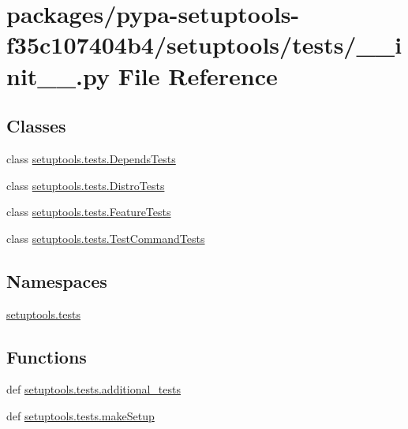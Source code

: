 \hypertarget{packages_2pypa-setuptools-f35c107404b4_2setuptools_2tests_2____init_____8py}{}\section{packages/pypa-\/setuptools-\/f35c107404b4/setuptools/tests/\+\_\+\+\_\+init\+\_\+\+\_\+.py File Reference}
\label{packages_2pypa-setuptools-f35c107404b4_2setuptools_2tests_2____init_____8py}
\subsection*{Classes}
\begin{DoxyCompactItemize}
\item 
class \hyperlink{classsetuptools_1_1tests_1_1DependsTests}{setuptools.\+tests.\+Depends\+Tests}
\item 
class \hyperlink{classsetuptools_1_1tests_1_1DistroTests}{setuptools.\+tests.\+Distro\+Tests}
\item 
class \hyperlink{classsetuptools_1_1tests_1_1FeatureTests}{setuptools.\+tests.\+Feature\+Tests}
\item 
class \hyperlink{classsetuptools_1_1tests_1_1TestCommandTests}{setuptools.\+tests.\+Test\+Command\+Tests}
\end{DoxyCompactItemize}
\subsection*{Namespaces}
\begin{DoxyCompactItemize}
\item 
 \hyperlink{namespacesetuptools_1_1tests}{setuptools.\+tests}
\end{DoxyCompactItemize}
\subsection*{Functions}
\begin{DoxyCompactItemize}
\item 
def \hyperlink{namespacesetuptools_1_1tests_a8d02ab6c90590322c4350a69612c9c69}{setuptools.\+tests.\+additional\+\_\+tests}
\item 
def \hyperlink{namespacesetuptools_1_1tests_ac71053e3fc6ebdd717aa840489b7a6c4}{setuptools.\+tests.\+make\+Setup}
\end{DoxyCompactItemize}
